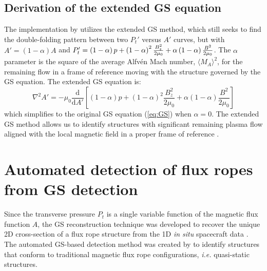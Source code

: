 \subsection{Derivation of the extended GS equation}
The implementation by \cite{Chen:2021} utilizes the extended GS method, which still seeks to find the double-folding pattern between two $P_t'$ versus $A'$ curves, but with $A'=(1-\alpha)A$ and $P_t'=\left( 1-\alpha \right)p + \left( 1-\alpha \right)^2\frac{B_z^2}{2\mu_0} + \alpha\left( 1-\alpha \right)\frac{B^2}{2\mu_0}$. The $\alpha$ parameter is the square of the average Alfv\'en Mach number, $\langle M_A \rangle^2$, for the remaining flow in a frame of reference moving with the structure governed by the GS equation. The extended GS equation \cite{Teh:2018} is:
\begin{equation}
    \nabla^2 A' = -\mu_0\frac{\mathrm{d}}{\mathrm{d}A'}\left[\left(1-\alpha\right)p + \left(1-\alpha\right)^2\frac{B_z^2}{2\mu_0} + \alpha\left(1-\alpha\right)\frac{B^2}{2\mu_0} \right]
    \label{eq:GSextended}
\end{equation}
which simplifies to the original GS equation (\ref{eq:GS}) when $\alpha=0$. The extended GS method allows us to identify structures with significant remaining plasma ﬂow aligned with the local magnetic field in a proper frame of reference \cite{Chen:2022}.

\section{Automated detection of flux ropes from GS detection}
Since the transverse pressure $P_t$ is a single variable function of the magnetic flux function $A$, the GS reconstruction technique was developed to recover the unique 2D cross-section of a flux rope structure from the 1D \textit{in situ} spacecraft data \cite{Hau:1999, HuSonnerup:2002, Hu:2017}. The automated GS-based detection method was created by \cite{Zheng:2018} to identify structures that conform to traditional magnetic flux rope configurations, \textit{i.e.} quasi-static structures.

